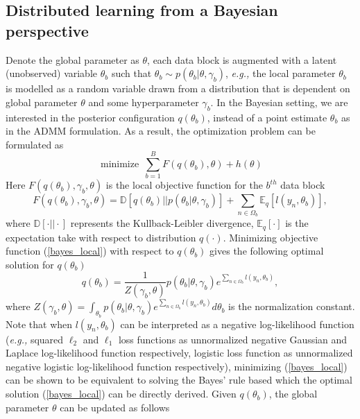 \documentclass{article}
\DeclareMathOperator*{\minimize}{minimize}
\newcommand{\eg}[0]{\emph{e.g., }}
\newcommand{\1}[0]{\ensuremath{\boldsymbol{1}}\xspace}
\begin{document}
\subsection{Distributed learning from a Bayesian perspective }

Denote the global parameter as $\theta$, each data block is augmented with a latent (unobserved) variable $\theta_b$ such that $\theta_b \sim p(\theta_b|\theta, \gamma_b)$, \eg the local parameter $\theta_b$ is modelled as a random variable drawn from a distribution that is dependent on global parameter $\theta$ and some hyperparameter $\gamma_b$. In the Bayesian setting, we are interested in the posterior configuration $q(\theta_b)$, instead of a point estimate $\theta_b$ as in the ADMM formulation.  As a result, the optimization problem can be formulated as
\begin{equation}\label{bayes_global}
\minimize ~ \sum_{b=1}^B F(q(\theta_b), \theta) + h(\theta)
\end{equation}
Here $F(q(\theta_b), \gamma_b, \theta)$ is the local objective function for the $b^{th}$ data block
\begin{equation}\label{bayes_local}
F(q(\theta_b), \gamma_b, \theta) = \mathbb{D}[q(\theta_b)||p(\theta_b|\theta, \gamma_b)] + \sum_{n\in\Omega_b}\mathbb{E}_q[l(y_n, \theta_b)],
\end{equation}
where $\mathbb{D}[\cdot||\cdot]$ represents the Kullback-Leibler divergence, $\mathbb{E}_q[\cdot]$ is the expectation take with respect to distribution $q(\cdot)$. Minimizing objective function (\ref{bayes_local}) with respect to $q(\theta_b)$ gives the following optimal solution for $q(\theta_b)$
\begin{equation}\label{bayes_local}
q(\theta_b) = \frac{1}{Z(\gamma_b, \theta)}p(\theta_b|\theta, \gamma_b)e^{\sum_{n\in\Omega_b}l(y_n, \theta_b)},
\end{equation}
where $Z(\gamma_b, \theta) = \int_{\theta_b}p(\theta_b|\theta, \gamma_b)e^{\sum_{n\in\Omega_b}l(y_n, \theta_b)}d\theta_b$ is the normalization constant. Note that when $l(y_n, \theta_b)$ can be interpreted as a negative log-likelihood function (\eg squared $\ell_2$ and $\ell_1$ loss functions as unnormalized negative Gaussian and Laplace log-likelihood function respectively, logistic loss function as unnormalized negative logistic log-likelihood function respectively), minimizing (\ref{bayes_local}) can be shown to be equivalent to solving the Bayes' rule based which the optimal solution (\ref{bayes_local}) can be directly derived. Given $q(\theta_b)$, the global parameter $\theta$ can be updated as follows
\end{document}
